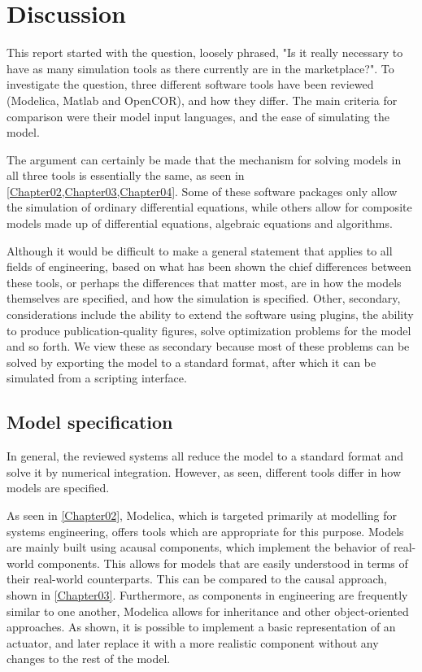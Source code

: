 \documentclass[\rootfolder/main.tex]{subfiles}
\begin{document}
\chapter{Discussion} %

\label{Chapter05} %

This report started with the question, loosely phrased, "Is it really necessary to have as many simulation tools as there currently are in the marketplace?".
To investigate the question, three different software tools have been reviewed (Modelica, Matlab and OpenCOR), and how they differ.
The main criteria for comparison were their model input languages, and the ease of simulating the model.

The argument can certainly be made that the mechanism for solving models in all three tools is essentially the same, as seen in \cref{Chapter02,Chapter03,Chapter04}.
Some of these software packages only allow the simulation of ordinary differential equations, while others allow for composite models made up of differential equations, algebraic equations and algorithms.

Although it would be difficult to make a general statement that applies to all fields of engineering, based on what has been shown the chief differences between these tools, or perhaps the differences that matter most, are in how the models themselves are specified, and how the simulation is specified.
Other, secondary, considerations include the ability to extend the software using plugins, the ability to produce publication-quality figures, solve optimization problems for the model and so forth.
We view these as secondary because most of these problems can be solved by exporting the model to a standard format, after which it can be simulated from a scripting interface.

\section{Model specification}

In general, the reviewed systems all reduce the model to a standard format and solve it by numerical integration.
However, as seen, different tools differ in how models are specified.

As seen in \cref{Chapter02}, Modelica, which is targeted primarily at modelling for systems engineering, offers tools which are appropriate for this purpose.
Models are mainly built using acausal components, which implement the behavior of real-world components.
This allows for models that are easily understood in terms of their real-world counterparts.
This can be compared to the causal approach, shown in \cref{Chapter03}.
Furthermore, as components in engineering are frequently similar to one another, Modelica allows for inheritance and other object-oriented approaches.
As shown, it is possible to implement a basic representation of an actuator, and later replace it with a more realistic component without any changes to the rest of the model.
\end{document}
